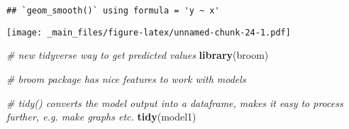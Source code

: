 \documentclass[
]{book}
\newenvironment{Shaded}{\begin{snugshade}}{\end{snugshade}}
\newcommand{\AttributeTok}[1]{\textcolor[rgb]{0.13,0.29,0.53}{#1}}
\newcommand{\CommentTok}[1]{\textcolor[rgb]{0.56,0.35,0.01}{\textit{#1}}}
\newcommand{\FunctionTok}[1]{\textcolor[rgb]{0.13,0.29,0.53}{\textbf{#1}}}
\newcommand{\NormalTok}[1]{#1}
\newcommand{\OtherTok}[1]{\textcolor[rgb]{0.56,0.35,0.01}{#1}}
\newcommand{\SpecialCharTok}[1]{\textcolor[rgb]{0.81,0.36,0.00}{\textbf{#1}}}
\newcommand{\StringTok}[1]{\textcolor[rgb]{0.31,0.60,0.02}{#1}}
\begin{document}
\begin{Shaded}
\end{Shaded}

\begin{verbatim}
## `geom_smooth()` using formula = 'y ~ x'
\end{verbatim}

\texttt{[image: \_main\_files/figure-latex/unnamed-chunk-24-1.pdf]}

\begin{Shaded}
\begin{Highlighting}[]
\CommentTok{\# new tidyverse way to get predicted values}
\FunctionTok{library}\NormalTok{(broom)}

\CommentTok{\# broom package has nice features to work with models}

\CommentTok{\# tidy() converts the model output into a dataframe, makes it easy to process further, e.g. make graphs etc.}
\FunctionTok{tidy}\NormalTok{(model1)}
\end{Highlighting}
\end{Shaded}
\end{document}

